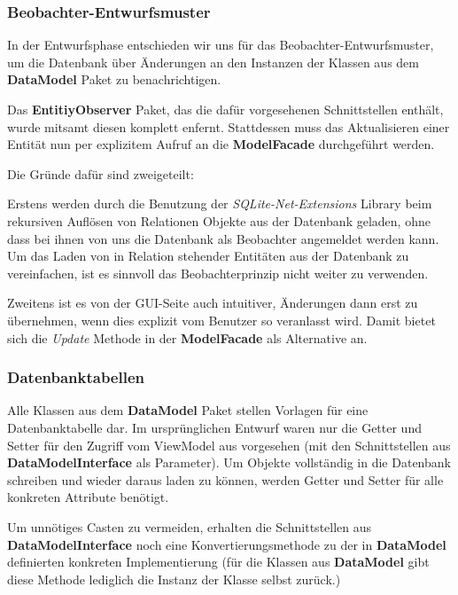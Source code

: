 \documentclass[a4paper]{scrreprt}
\begin{document}
\subsubsection{Beobachter-Entwurfsmuster}
In der Entwurfsphase entschieden wir uns für das Beobachter-Entwurfsmuster, um die Datenbank über Änderungen an den Instanzen der Klassen aus dem \textbf{DataModel} Paket zu benachrichtigen.

Das \textbf{EntitiyObserver} Paket, das die dafür vorgesehenen Schnittstellen enthält, wurde mitsamt diesen komplett enfernt. Stattdessen muss das Aktualisieren einer Entität nun per explizitem Aufruf an die \textbf{ModelFacade} durchgeführt werden.

Die Gründe dafür sind zweigeteilt:

Erstens werden durch die Benutzung der \textit{SQLite-Net-Extensions} Library beim rekursiven Auflösen von Relationen Objekte aus der Datenbank geladen, ohne dass bei ihnen von uns die Datenbank als Beobachter angemeldet werden kann. Um das Laden von in Relation stehender Entitäten aus der Datenbank zu vereinfachen, ist es sinnvoll das Beobachterprinzip nicht weiter zu verwenden.

Zweitens ist es von der GUI-Seite auch intuitiver, Änderungen dann erst zu übernehmen, wenn dies explizit vom Benutzer so veranlasst wird. Damit bietet sich die \textit{Update} Methode in der \textbf{ModelFacade} als Alternative an.

\subsubsection{Datenbanktabellen}
Alle Klassen aus dem \textbf{DataModel} Paket stellen Vorlagen für eine Datenbanktabelle dar. Im ursprünglichen Entwurf waren nur die Getter und Setter für den Zugriff vom ViewModel aus vorgesehen (mit den Schnittstellen aus \textbf{DataModelInterface} als Parameter). Um Objekte vollständig in die Datenbank schreiben und wieder daraus laden zu können,  werden Getter und Setter für alle konkreten Attribute benötigt.

Um unnötiges Casten zu vermeiden, erhalten die Schnittstellen aus \textbf{DataModelInterface} noch eine Konvertierungsmethode zu der in \textbf{DataModel} definierten konkreten Implementierung (für die Klassen aus \textbf{DataModel} gibt diese Methode lediglich die Instanz der Klasse selbst zurück.)
\end{document}
